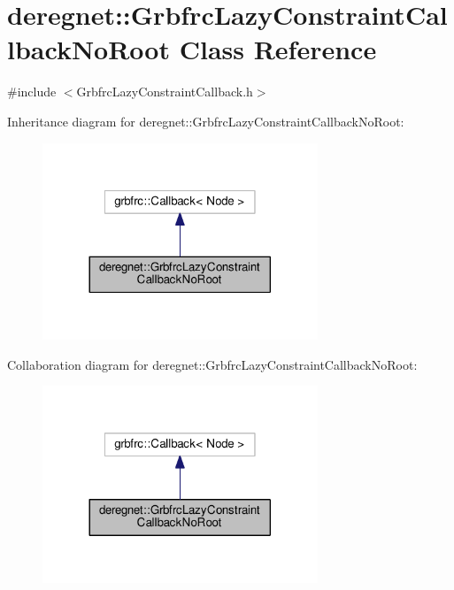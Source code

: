 \hypertarget{classderegnet_1_1GrbfrcLazyConstraintCallbackNoRoot}{}\section{deregnet\+:\+:Grbfrc\+Lazy\+Constraint\+Callback\+No\+Root Class Reference}
\label{classderegnet_1_1GrbfrcLazyConstraintCallbackNoRoot}


{\ttfamily \#include $<$Grbfrc\+Lazy\+Constraint\+Callback.\+h$>$}



Inheritance diagram for deregnet\+:\+:Grbfrc\+Lazy\+Constraint\+Callback\+No\+Root\+:
\nopagebreak
\begin{figure}[H]
\begin{center}
\leavevmode
\includegraphics[width=233pt]{classderegnet_1_1GrbfrcLazyConstraintCallbackNoRoot__inherit__graph}
\end{center}
\end{figure}


Collaboration diagram for deregnet\+:\+:Grbfrc\+Lazy\+Constraint\+Callback\+No\+Root\+:
\nopagebreak
\begin{figure}[H]
\begin{center}
\leavevmode
\includegraphics[width=233pt]{classderegnet_1_1GrbfrcLazyConstraintCallbackNoRoot__coll__graph}
\end{center}
\end{figure}
